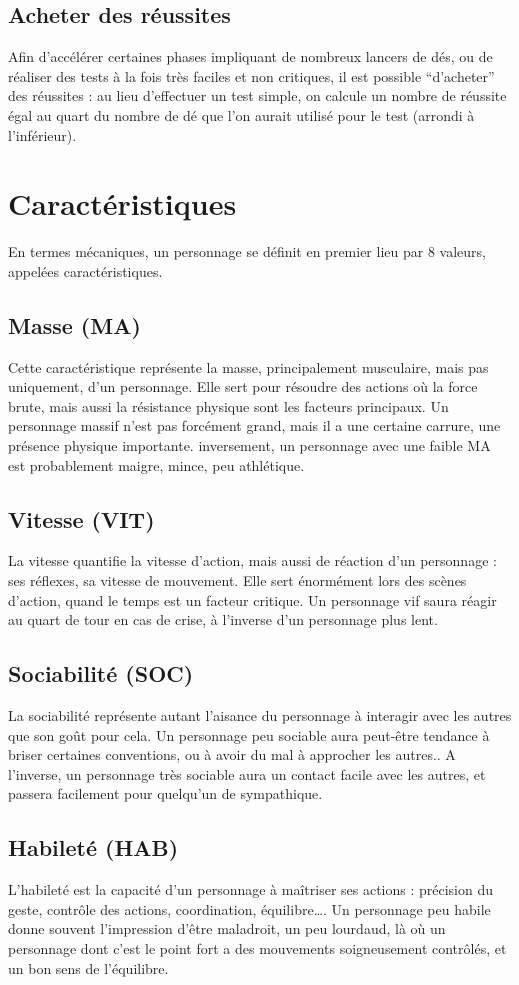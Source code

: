 \documentclass[10pt,a4paper,twocolumn]{book}
\begin{document}
\section{Acheter des réussites}
Afin d’accélérer certaines phases impliquant de nombreux lancers de dés, ou de réaliser des tests à la fois très faciles et non critiques, il est possible “d’acheter” des réussites : au lieu d’effectuer un test simple, on calcule un nombre de réussite égal au quart du nombre de dé que l’on aurait utilisé pour le test (arrondi à l’inférieur).

\chapter{Caractéristiques}
En termes mécaniques, un personnage se définit en premier lieu par 8 valeurs, appelées caractéristiques.
\section{Masse (MA)}
Cette caractéristique représente la masse, principalement musculaire, mais pas uniquement, d’un personnage. Elle sert pour résoudre des actions où la force brute, mais aussi la résistance physique sont les facteurs principaux.
Un personnage massif n’est pas forcément grand, mais il a une certaine carrure, une présence physique importante.
inversement, un personnage avec une faible MA est probablement maigre, mince, peu athlétique.
\section{Vitesse (VIT)}
La vitesse quantifie la vitesse d’action, mais aussi de réaction d’un personnage : ses réflexes, sa vitesse de mouvement. Elle sert énormément lors des scènes d’action, quand le temps est un facteur critique.
Un personnage vif saura réagir au quart de tour en cas de crise, à l’inverse d’un personnage plus lent.
\section{Sociabilité (SOC)}
La sociabilité représente autant  l’aisance du personnage à interagir avec les autres que son goût pour cela.
Un personnage peu sociable aura peut-être tendance à briser certaines conventions, ou à avoir du mal à approcher les autres.. A l’inverse, un personnage très sociable aura un contact facile avec les autres, et passera facilement pour quelqu’un de sympathique.
\section{Habileté (HAB)}
L’habileté est la capacité d’un personnage à maîtriser ses actions : précision du geste, contrôle des actions, coordination, équilibre….
Un personnage peu habile donne souvent l’impression d’être maladroit, un peu lourdaud, là où un personnage dont c’est le point fort a des mouvements soigneusement contrôlés, et un bon sens de l’équilibre.
\end{document}
